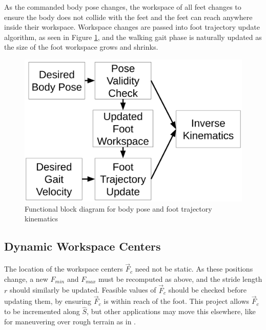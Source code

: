 As the commanded body pose changes, the workspace of all feet changes to ensure the body does not collide with the feet and the feet can reach anywhere inside their workspace. Workspace changes are passed into foot trajectory update algorithm, as seen in Figure \ref{fig:pose_kinematics_flow}, and the walking gait phase is naturally updated as the size of the foot workspace grows and shrinks. 

\begin{figure}[H]
    \centerline{\includegraphics[scale=0.095]{05_methods/figures/new_block_diagram.png}}
    \caption{Functional block diagram for body pose and foot trajectory kinematics}
    \label{fig:pose_kinematics_flow}
\end{figure}

\subsection{ Dynamic Workspace Centers }
The location of the workspace centers $\vec{F}_c$ need not be static. As these positions change, a new $F_{min}$ and $F_{max}$ must be recomputed as above, and the stride length $r$ should similarly be updated. Feasible values of $\vec{F}_c$ should be checked before updating them, by ensuring $\vec{F}_c$ is within reach of the foot. This project allows $\vec{F}_c$ to be incremented along $\hat{S}$, but other applications may move this elsewhere, like for maneuvering over rough terrain as in \cite{foot_placement}. 



